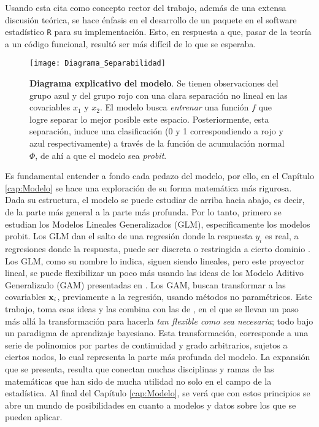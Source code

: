 \documentclass[../Main/Main.tex]{subfiles}
\begin{document}
Usando esta cita como concepto rector del trabajo, además de una extensa discusión teórica, se hace énfasis en el desarrollo de un paquete en el software estadístico \verb|R| para su implementación. Esto, en respuesta a que, pasar de la teoría a un código funcional, resultó ser más difícil de lo que se esperaba. \\

\begin{figure}[h]
  \centering
      \texttt{[image: Diagrama\_Separabilidad]}
  \caption{\textbf{Diagrama explicativo del modelo}. Se tienen observaciones del grupo azul y del grupo rojo con una clara separación no lineal en las covariables $x_1$ y $x_2$. El modelo busca \textit{entrenar} una función $f$ que logre separar lo mejor posible este espacio. Posteriormente, esta separación, induce una clasificación (0 y 1 correspondiendo a rojo y azul respectivamente) a través de la función de acumulación normal $\Phi$, de ahí a que el modelo sea \textit{probit}.}
 \label{fig:DiagramaIntro}
\end{figure}

Es fundamental entender a fondo cada pedazo del modelo, por ello, en el Capítulo \ref{cap:Modelo} se hace una exploración de su forma matemática más rigurosa. Dada su estructura, el modelo  se puede estudiar de arriba hacia abajo, es decir, de la parte más general a la parte más profunda. Por lo tanto, primero se estudian los Modelos Lineales Generalizados (GLM), específicamente los modelos probit. Los GLM dan el salto de una regresión donde la respuesta $y_i$ es real, a regresiones donde la respuesta, puede ser discreta o restringida a cierto dominio \autocite{maccullagh1989generalized}. Los GLM, como su nombre lo indica, siguen siendo lineales, pero este proyector lineal, se puede flexibilizar un poco más usando las ideas de los Modelo Aditivo Generalizado (GAM) presentadas en \autocite{hastie1986generalized}. Los GAM, buscan transformar a las covariables $\mathbf{x}_i$, previamente a la regresión, usando métodos no paramétricos. Este trabajo, toma esas ideas y las combina con las de \autocite{mallik1998automatic}, en el que se llevan un paso más allá la transformación para hacerla \textit{tan flexible como sea necesaria}; todo bajo un paradigma de aprendizaje bayesiano. Esta transformación, corresponde a una serie de polinomios por partes de continuidad y grado arbitrarios, sujetos a ciertos nodos, lo cual representa la parte más profunda del modelo. La expansión que se presenta, resulta que conectan muchas disciplinas y ramas de las matemáticas que han sido de mucha utilidad no solo en el campo de la estadística. Al final del Capítulo \ref{cap:Modelo}, se verá que con estos principios se abre un mundo de posibilidades en cuanto a modelos y datos sobre los que se pueden aplicar.\\
\end{document}
